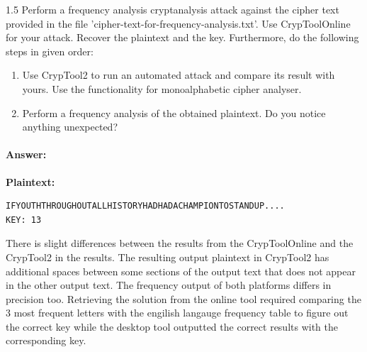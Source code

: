 \documentclass[]{scrartcl}
\newcounter{exercise}
\newcounter{qid}[section]
\newcommand{\exerciseprefix}{prefix}
\newcommand{\questiontitle}{Questions}
\newcommand{\blockid}{B2}
\newcommand{\exname}{}
\newcommand{\cttwo}{CrypTool2}
\newcommand{\ctonline}{CrypToolOnline}
\begin{document}
\bigskip
 


\renewcommand{\exerciseprefix}{PS-\blockid{}-E\theexercise: \exname{}-Q\theqid}
\renewcommand{\questiontitle}{\exerciseprefix{}: Frequency analysis on shift cipher}
\begin{exercisebox}{1.5}
Perform a frequency analysis cryptanalysis attack against the cipher text provided in the file 'cipher-text-for-frequency-analysis.txt'. Use \ctonline{} for your attack.  
Recover the plaintext and the key. Furthermore, do the following steps in given order:
\begin{enumerate}
    \item Use \cttwo{} to run an automated attack and compare its result with yours. Use the functionality for monoalphabetic cipher analyser. 
    \item Perform a frequency analysis of the obtained plaintext. Do you notice anything unexpected?
\end{enumerate}
\end{exercisebox}

\paragraph{Answer:} 


\noindent\textbf{Plaintext:}
\begin{lstlisting}[style=plusStyle, basicstyle=\tiny\ttfamily]
IFYOUTHTHROUGHOUTALLHISTORYHADHADACHAMPIONTOSTANDUP....                                  KEY: 13
\end{lstlisting}

There is slight differences between the results from the CrypToolOnline and the CrypTool2 in the results.
The resulting output plaintext in CrypTool2 has additional spaces between some sections of the output text that does not appear in the other output text.
The frequency output of both platforms differs in precision too. Retrieving the solution from the online tool required comparing the 3 most frequent letters with the engilish langauge frequency table to figure out the correct key while the desktop tool outputted the correct results with the corresponding key.





\bigskip
\end{document}
